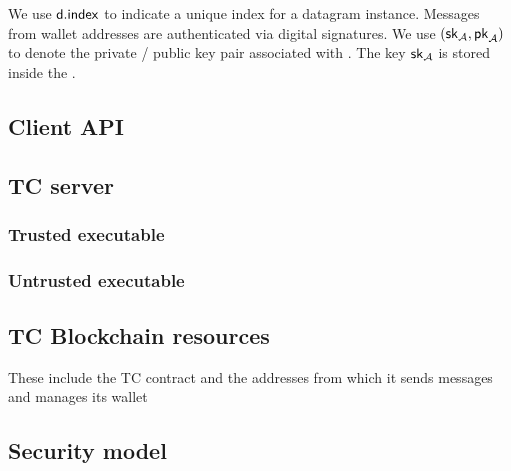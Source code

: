 We use ${\sf d.index}$ to indicate a unique index for a datagram instance. Messages from wallet addresses are authenticated via digital signatures. We use $({{\sf sk}_{\cal A}}, {\sf pk}_{\cal A})$ to denote the private / public key pair associated with \tcadd. The key ${{\sf sk}_{\cal A}}$ is stored inside the \encname. 


\subsection{Client API}
\subsection{TC server}
\subsubsection{Trusted executable}
\subsubsection{Untrusted executable}
\subsection{TC Blockchain resources}
These include the TC contract and the addresses from which it sends messages and manages its wallet
\subsection{Security model}


